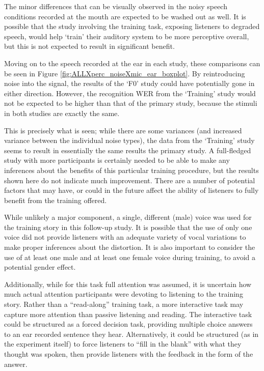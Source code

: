 \documentclass[dissertation,copyright]{uathesis}
\begin{document}
The minor differences that can be visually observed in the noisy speech conditions recorded at the mouth are expected to be washed out as well.  It is possible that the study involving the training task, exposing listeners to degraded speech, would help `train' their auditory system to be more perceptive overall, but this is not expected to result in significant benefit.

Moving on to the speech recorded at the ear in each study, these comparisons can be seen in Figure \ref{fig:ALLXperc_noiseXmic_ear_boxplot}.  By reintroducing noise into the signal, the results of the `F0' study could have potentially gone in either direction.  However, the recognition WER from the `Training' study would not be expected to be higher than that of the primary study, because the stimuli in both studies are exactly the same.  

This is precisely what is seen; while there are some variances (and increased variance between the individual noise types), the data from the `Training' study seems to result in essentially the same results the primary study.  A full-fledged study with more participants is certainly needed to be able to make any inferences about the benefits of this particular training procedure, but the results shown here do not indicate much improvement.  There are a number of potential factors that may have, or could in the future affect the ability of listeners to fully benefit from the training offered.  

While unlikely a major component, a single, different (male) voice was used for the training story in this follow-up study.  It is possible that the use of only one voice did not provide listeners with an adequate variety of vocal variations to make proper inferences about the distortion.  It is also important to consider the use of at least one male and at least one female voice during training, to avoid a potential gender effect.

Additionally, while for this task full attention was assumed, it is uncertain how much actual attention participants were devoting to listening to the training story.  Rather than a ``read-along'' training task, a more interactive task may capture more attention than passive listening and reading.  The interactive task could be structured as a forced decision task, providing multiple choice answers to an ear recorded sentence they hear.  Alternatively, it could be structured (as in the experiment itself) to force listeners to ``fill in the blank'' with what they thought was spoken, then provide listeners with the feedback in the form of the answer.  
\end{document}
